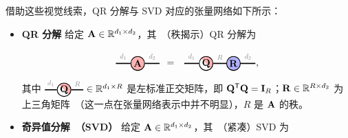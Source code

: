 借助这些视觉线索，QR 分解与 SVD 对应的张量网络如下所示：
\begin{itemize}
    \item\textbf{QR 分解} 给定 $\mathbf{A}\in\mathbb{R}^{d_1\times d_2}$，其~（秩揭示）QR 分解为 
    
$$
\begin{tikzpicture}[baseline=\baseline]
    \tikzset{tensor/.style = {minimum size = 0.5cm,shape = circle,thick,draw=black,inner sep = 0pt}, edge/.style   = {thick,line width=.4mm},every loop/.style={}}
    \def\y{-0.2}
    \def\x{0}
    \node[tensor,fill=red!30!white] (A) at (\x,\y+0.2){$\Ab$};
    \draw[edge] (A) -- (\x-0.8,\y+0.2)  node [midway,above] {\scalebox{0.7}{\dimcolor{$d_1$}}};
    \draw[edge] (A) -- (\x+0.8,\y+0.2)  node [midway,above] {\scalebox{0.7}{\dimcolor{$d_2$}}};
    \node[draw = none] at (\x+1.2,\y+0.2){$=$};
    \node[tensor, path picture={
    \fill[fill=red!30!white](path picture bounding box.south east)
    -- 
    (path picture bounding box.north west) --
    (path picture bounding box.north east) -- cycle;
    }, shift={(\x+2.5,\y+0.2)}] (Q) {$\Qb$};
    \node[tensor,fill=blue!30!white] (R) at (\x+3.5,\y+0.2){$\Rb$};
    \draw[edge] (Q) -- (R)  node [midway,above] {\scalebox{0.7}{\dimcolor{$R$}}};
    \draw[edge] (Q) -- (\x+1.7,\y+0.2)  node [midway,above] {\scalebox{0.7}{\dimcolor{$d_1$}}};
    \draw[edge] (R) -- (\x+4.3,\y+0.2)  node [midway,above] {\scalebox{0.7}{\dimcolor{$d_2$}}};
\end{tikzpicture},$$
其中 
$\begin{tikzpicture}[baseline=\baseline]
    \tikzset{tensor/.style = {minimum size = 0.5cm,shape = circle,thick,draw=black,inner sep = 0pt}, edge/.style   = {thick,line width=.4mm},every loop/.style={}}
    \def\y{0}
    \def\x{0}
    \node[tensor, path picture={
    \fill[fill=red!30!white](path picture bounding box.south east)
    -- 
    (path picture bounding box.north west) --
    (path picture bounding box.north east) -- cycle;
    }, shift={(\x,\y)}] (Q) {$\Qb$};
    \draw[edge] (Q) -- (\x+0.7,\y)  node [midway,above] {\scalebox{0.7}{\dimcolor{$R$}}};
    \draw[edge] (Q) -- (\x-0.7,\y)  node [midway,above] {\scalebox{0.7}{\dimcolor{$d_1$}}};
\end{tikzpicture}
\in\RR^{d_1\times R}$
是左标准正交矩阵，即 $\mathbf{Q}^{\mathsf{T}}\mathbf{Q} = \mathbf{I}_R$；$\mathbf{R}\in\mathbb{R}^{R\times d_2}$ 为上三角矩阵~（这一点在张量网络表示中并不明显），$R$ 是 $\mathbf{A}$ 的秩。 
\item \textbf{奇异值分解~（SVD）} 给定 $\mathbf{A}\in\mathbb{R}^{d_1\times d_2}$，其~（紧凑）SVD 为 
\begin{align*}

\end{align*}
\end{itemize}
